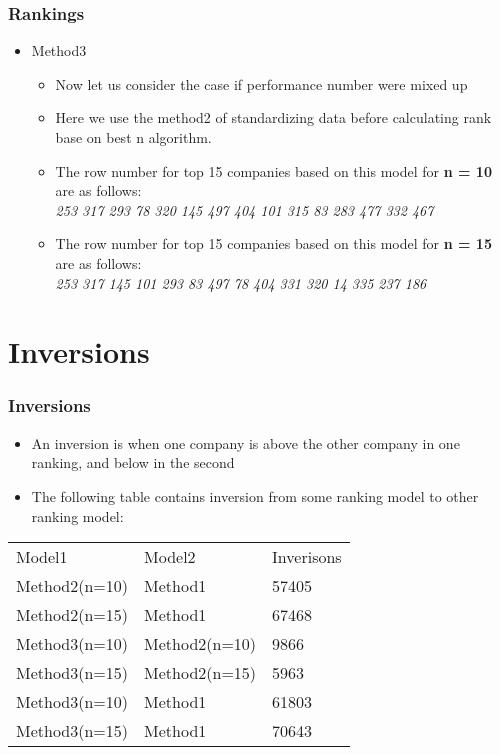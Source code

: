 \documentclass[pdf]{beamer}
\begin{document}
\begin{frame}
	\frametitle{Rankings}
	\begin{itemize} 
		\subsection{Method3}
			\item Method3
			\begin{itemize} 
				\item Now let us consider the case if performance number were mixed up
				\item Here we use the method2 of standardizing data before calculating rank base on best n algorithm.
				\item The row number for top 15 companies based on this model for \textbf{n = 10} are as follows:\\
				\textit{253 317 293  78 320 145 497 404 101 315  83 283 477 332 467}\\
				\item The row number for top 15 companies based on this model for \textbf{n = 15} are as follows:\\
				\textit{253 317 145 101 293  83 497  78 404 331 320  14 335 237 186}\\ 
			\end{itemize}
	\end{itemize}
\end{frame}

\section{Inversions}
\begin{frame}
	\frametitle{Inversions}
	\begin{itemize} 
		\item An inversion is when one company is above the other company in one ranking, and below in the second
		\item The following table contains inversion from some ranking model to other ranking model:
	\end{itemize}
	\begin{tabular}{p{3cm} p{3cm} p{3cm}}
		Model1 & Model2 & Inverisons \\
		Method2(n=10) & Method1 & 57405\\
		Method2(n=15) & Method1 & 67468\\
		Method3(n=10) & Method2(n=10) & 9866\\
		Method3(n=15) & Method2(n=15) & 5963\\
		Method3(n=10) & Method1 & 61803\\
		Method3(n=15) & Method1 & 70643\\
	\end{tabular}
\end{frame}
\end{document}
